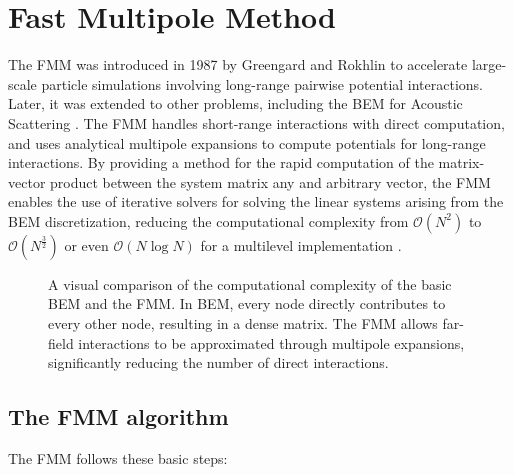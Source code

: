 \section{Fast Multipole Method}\label{sec:fmm}

The \ac{FMM} was introduced in 1987 by Greengard and Rokhlin \cite{greengardfastalgorithmparticle1987} to accelerate large-scale particle simulations involving long-range pairwise potential interactions. Later, it was extended to other problems, including the \ac{BEM} for Acoustic Scattering \cite{rokhlinrapidsolutionintegral1990}. The \ac{FMM} handles short-range interactions with direct computation, and uses analytical multipole expansions to compute potentials for long-range interactions. By providing a method for the rapid computation of the matrix-vector product between the system matrix any and arbitrary vector, the \ac{FMM} enables the use of iterative solvers for solving the linear systems arising from the \ac{BEM} discretization, reducing the computational complexity from $\mathcal{O}(N^2)$ to $\mathcal{O}(N^{\frac{3}{2}})$ or even $\mathcal{O}(N \log N)$ for a multilevel implementation \cite{coifmanfastmultipolemethod1993}.

\begin{figure} [htpb]
    \centering
    
    \caption{A visual comparison of the computational complexity of the basic \ac{BEM} and the \ac{FMM}. In \ac{BEM}, every node directly contributes to every other node, resulting in a dense matrix. The \ac{FMM} allows far-field interactions to be approximated through multipole expansions, significantly reducing the number of direct interactions.}
\end{figure}



\subsection{The \ac{FMM} algorithm} \label{subsec:fmm_algorithm}

The \ac{FMM} follows these basic steps:


